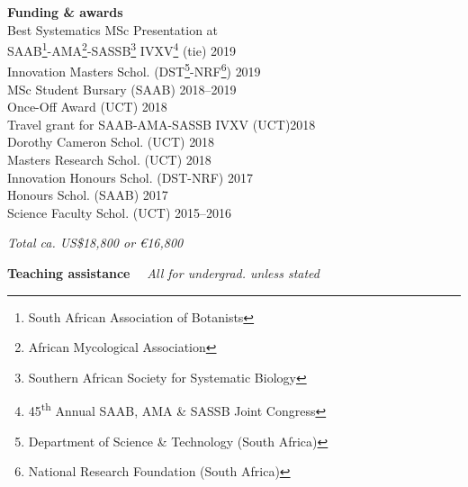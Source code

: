 \documentclass[10pt]{article}
\begin{document}
\begin{multicols}{2}

\textbf{Funding \& awards}\\ %

Best Systematics MSc Presentation at \\
\hspace{2em} SAAB\footnote{South African Association of Botanists}-AMA\footnote{
  African Mycological Association}-SASSB\footnote{Southern African Society for
  Systematic Biology} IVXV\footnote{45\textsuperscript{th} Annual SAAB, AMA \&
  SASSB Joint Congress} (tie)                      \hfill {\small       2019} \\
Innovation Masters Schol. {\small (DST\footnote{Department of
  Science \& Technology (South Africa)}-NRF\footnote{National Research
  Foundation (South Africa)})}                     \hfill {\small       2019} \\
MSc Student Bursary {\small (SAAB)}                \hfill {\small 2018--2019} \\
Once-Off Award {\small (UCT)}                      \hfill {\small       2018} \\
Travel grant for SAAB-AMA-SASSB IVXV {\small (UCT)}\hfill {\small       2018} \\
Dorothy Cameron Schol. {\small (UCT)}              \hfill {\small       2018} \\
Masters Research Schol. {\small (UCT)}             \hfill {\small       2018} \\
Innovation Honours Schol. {\small (DST-NRF)}       \hfill {\small       2017} \\
Honours Schol. {\small (SAAB)}                     \hfill {\small       2017} \\
Science Faculty Schol. {\small (UCT)}              \hfill {\small 2015--2016}

\begin{center}
  \textit{Total ca. US\$18,800 or €16,800}
\end{center}

\columnbreak

\textbf{Teaching assistance} %
  ~~{\small \textmd{\textit{All for undergrad. unless stated}}}\\


\end{multicols}
\end{document}

